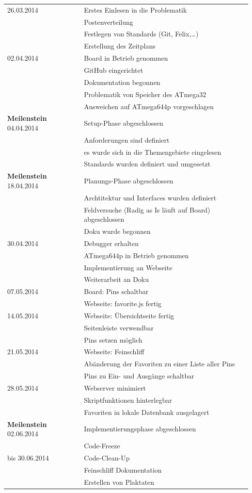 \begin{longtable}{ll}
26.03.2014 & Erstes Einlesen in die Problematik \\
& Postenverteilung\\
& Festlegen von Standards (Git, Felix,\ldots) \\
& Erstellung des Zeitplans \\
02.04.2014 & Board in Betrieb genommen\\
& GitHub eingerichtet\\ 
&Dokumentation begonnen\\ 
& Problematik von Speicher des ATmega32\\
& Ausweichen auf ATmega644p vorgeschlagen \\
\textbf{Meilenstein} 04.04.2014 & Setup-Phase abgeschlossen \\
& Anforderungen sind definiert\\
& es wurde sich in die 
Themengebiete eingelesen\\
& Standards wurden definiert und umgesetzt\\
\textbf{Meilenstein} 18.04.2014 & Planungs-Phase abgeschlossen \\
& Archtitektur und Interfaces wurden definiert\\
& Feldversuche (Radig as Is läuft auf Board) abgeschlossen \\
& Doku wurde begonnen\\
30.04.2014 & Debugger erhalten\\
& ATmega644p in Betrieb genommen\\
& Implementierung an Webseite\\
& Weiterarbeit an Doku \\
07.05.2014 & Board: Pins schaltbar \\
& Webseite: favorite.js fertig \\
14.05.2014 & Webseite: Übersichtseite fertig\\
& Seitenleiste verwendbar\\
& Pins setzen möglich\\
21.05.2014 & Webseite: Feinschliff\\ 
&Abänderung der Favoriten zu einer Liste aller Pins\\
& Pins zu Ein- und Ausgänge schaltbar \\
28.05.2014 & Webserver minimiert\\
& Skriptfunktionen hinterlegbar\\
& Favoriten in lokale Datenbank ausgelagert \\
\textbf{Meilenstein} 02.06.2014 & Implementierungsphase abgeschlossen \\
& Code-Freeze\\
bis 30.06.2014 & Code-Clean-Up\\
& Feinschliff Dokumentation\\
& Erstellen von Plaktaten\\
\end{longtable}


